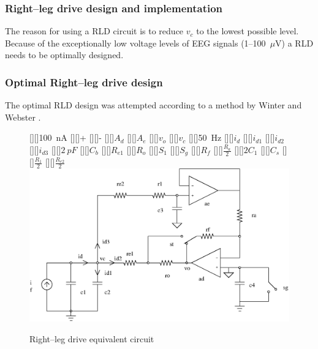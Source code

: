 \subsubsection{Right--leg drive design and implementation}

The reason for using a RLD circuit is to reduce $v_c$ to the lowest
possible level. Because of the exceptionally low voltage levels of EEG
signals (1--100~$\mu$V) a RLD needs to be optimally designed.

\subsubsection{Optimal Right--leg drive design}

The optimal RLD design was attempted according to a method by Winter
and Webster \cite{drive}.


\begin{figure}[htbp]
	\begin{center}
	[][]{100~nA}
	\psfrag{+}[][]{+}
	\psfrag{-}[][]{-}
	[][]{$A_d$}
	[][]{$A_e$}
	[][]{$v_o$}
	[][]{$v_c$}
	[][]{50~Hz}
	[][]{$i_d$}
	[][]{$i_{d1}$}
	[][]{$i_{d2}$}
	[][]{$i_{d3}$}
	[][]{$2~pF$}
	[][]{$C_b$}
	[][]{$R_{e1}$}
	[][]{$R_o$}
	[][]{$S_1$}
	[][]{$S_g$}
	[][]{$R_f$}
	[][]{$\frac{R_a}{2}$}
	[][]{$2C_1$}
	[][]{$C_s$}
	[][]{$\frac{R_1}{2}$}
	[][]{$\frac{R_{e2}}{2}$}
	\includegraphics[width=\textwidth]{rld-opt1.eps}
	\caption{Right--leg drive equivalent circuit}
	\label{fig:rld-opt1} 
	\end{center}
\end{figure}


